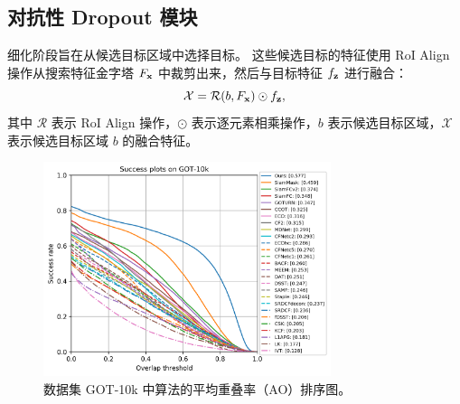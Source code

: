 \subsection{对抗性 Dropout 模块}
\label{sec:stage2}
细化阶段旨在从候选目标区域中选择目标。
这些候选目标的特征使用 RoI Align \cite{he2017mask} 操作从搜索特征金字塔 $F_{\textbf x}$ 中裁剪出来，然后与目标特征 $f_{\textbf z}$ 进行融合：
\begin{equation}
    \mathcal{X} = \mathcal{R}(b, F_{\textbf x}) \odot f_{\textbf z},
\end{equation}
其中 $\mathcal{R}$ 表示 RoI Align 操作，$\odot$ 表示逐元素相乘操作，$b$ 表示候选目标区域，$\mathcal{X}$ 表示候选目标区域 $b$ 的融合特征。

\begin{figure}[t]
    \centering
    \includegraphics[width=0.75\textwidth]{Img/end/success_plot.png}
    \caption{数据集 GOT-10k \cite{GOT-10k} 中算法的平均重叠率（AO）排序图。}
    \label{fig:end_uav20l}
\end{figure}


